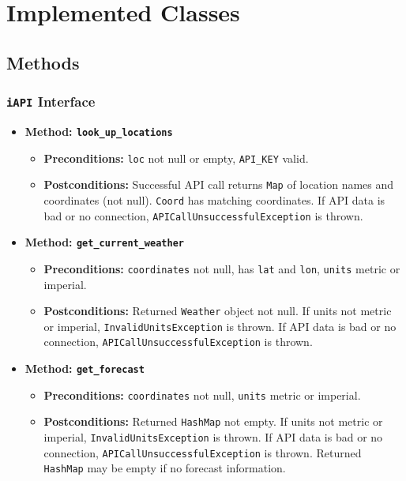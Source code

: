 \documentclass[a4paper,10pt]{article}
\begin{document}
\section{Implemented Classes}

\subsection*{Methods}

\subsubsection*{\texttt{iAPI} Interface}

\begin{itemize}
    \item \textbf{Method: \texttt{look\_up\_locations}}
    \begin{itemize}
        \item \textbf{Preconditions:} \texttt{loc} not null or empty, \texttt{API\_KEY} valid.
        \item \textbf{Postconditions:} Successful API call returns \texttt{Map} of location names and coordinates (not null). \texttt{Coord} has matching coordinates. If API data is bad or no connection, \texttt{APICallUnsuccessfulException} is thrown.
    \end{itemize}
    
    \item \textbf{Method: \texttt{get\_current\_weather}}
    \begin{itemize}
        \item \textbf{Preconditions:} \texttt{coordinates} not null, has \texttt{lat} and \texttt{lon}, \texttt{units} metric or imperial.
        \item \textbf{Postconditions:} Returned \texttt{Weather} object not null. If units not metric or imperial, \texttt{InvalidUnitsException} is thrown. If API data is bad or no connection, \texttt{APICallUnsuccessfulException} is thrown.
    \end{itemize}

    \item \textbf{Method: \texttt{get\_forecast}}
    \begin{itemize}
        \item \textbf{Preconditions:} \texttt{coordinates} not null, \texttt{units} metric or imperial.
        \item \textbf{Postconditions:} Returned \texttt{HashMap} not empty. If units not metric or imperial, \texttt{InvalidUnitsException} is thrown. If API data is bad or no connection, \texttt{APICallUnsuccessfulException} is thrown. Returned \texttt{HashMap} may be empty if no forecast information.
    \end{itemize}
    

\end{itemize}
\end{document}
